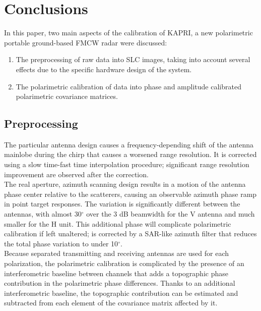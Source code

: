 \section{Conclusions}\label{sec:conclusions}
In this paper, two main aspects of the calibration of KAPRI, a new polarimetric portable ground-based FMCW radar were discussed:
\begin{enumerate}
	\item The preprocessing of raw data into SLC images, taking into account several effects due to the specific hardware design of the system.
	\item The polarimetric calibration of data into phase and amplitude calibrated polarimetric covariance matrices.
\end{enumerate}
\subsection{Preprocessing}
 The particular antenna design causes a frequency-depending shift of the antenna mainlobe during the chirp that causes a worsened range resolution. It is corrected using a slow time-fast time interpolation procedure; significant range resolution improvement are observed after the correction.\\ The real aperture, azimuth scanning design results in a motion of the antenna phase center relative to the scatterers, causing an observable azimuth phase ramp in point target responses. The variation is significantly different between the antennas, with almost 30$^\circ$ over the 3 dB beamwidth for the V antenna and much smaller for the H unit. This additional phase will complicate polarimetric calibration if left unaltered; is corrected by a SAR-like azimuth filter that reduces the total phase variation to under 10$^\circ$.\\
Because separated transmitting and receiving antennas are used for each polarization, the polarimetric calibration is complicated by the presence of an interferometric baseline between channels that adds a topographic phase contribution in the polarimetric phase differences. Thanks to an additional interferometric baseline, the topographic contribution can be estimated and subtracted from each element of the covariance matrix affected by it.
